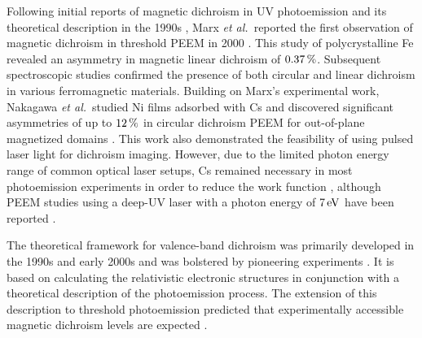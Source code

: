 \documentclass[prl,twocolumn,floatfix,superscriptaddress,aps]{revtex4-2}
\begin{document}
Following initial reports of magnetic dichroism in UV photoemission and its theoretical description in the 1990s \cite{schneider1991,henk1996,feder1996}, Marx \textit{et al.}\ reported the first observation of magnetic dichroism in threshold PEEM in 2000 \cite{marx2000}. This study of polycrystalline Fe revealed an asymmetry in magnetic linear dichroism of $\unit[0.37]{\%}$. Subsequent spectroscopic studies confirmed the presence of both circular and linear dichroism in various ferromagnetic materials. Building on Marx's experimental work, Nakagawa \textit{et al.}\ studied Ni films adsorbed with Cs and discovered significant asymmetries of up to $\unit[12]{\%}$ in circular dichroism PEEM for out-of-plane magnetized domains \cite{nakagawa2006,nakagawa2007,nakagawa2009,nakagawa2012}. This work also demonstrated the feasibility of using pulsed laser light for dichroism imaging. However, due to the limited photon energy range of common optical laser setups, Cs remained necessary in most photoemission experiments in order to reduce the work function \cite{kronseder2011, meier2017}, although PEEM studies using a deep-UV laser with a photon energy of $\unit[7]{eV}$ have been reported \cite{zhao2019}. 

The theoretical framework for valence-band dichroism was primarily developed in the 1990s and early 2000s \cite{tamura1987, feder1996,henk1996,kuch1996a,feder1998,venus1994,venus1997,kuch2001} and was bolstered by pioneering experiments \cite{venus95, hild2008, hild2009, hild2010}. It is based on calculating the relativistic electronic  structures in conjunction with a theoretical description of the photoemission process. 
The extension of this description to threshold photoemission predicted that experimentally accessible magnetic dichroism levels are expected \cite{feder1998}. 
\end{document}
